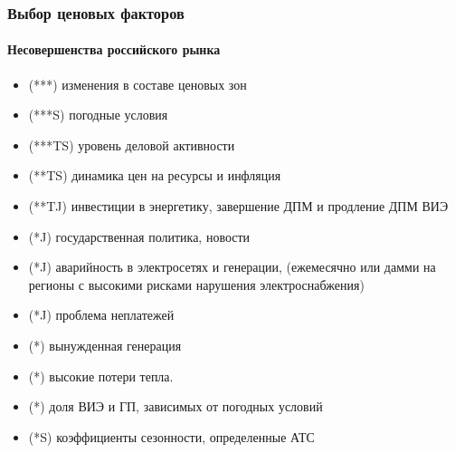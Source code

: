 \documentclass[c, dvipsnames]{beamer}  %
\begin{document}
\begin{frame}[shrink=5]
\frametitle{Выбор ценовых факторов } 
\framesubtitle{Несовершенства российского рынка} 

\begin{itemize}
	\item  (***)   изменения в составе ценовых зон
	\item  (***S)   погодные условия 
	\item  (***TS) уровень деловой активности  
	\item  (**TS) динамика цен на ресурсы и инфляция
	\item  (**TJ) инвестиции в энергетику, завершение ДПМ и продление ДПМ ВИЭ
	\item  (*J) государственная политика, новости
	\item  (*J) аварийность в электросетях и генерации, (ежемесячно или дамми на регионы с высокими рисками нарушения электроснабжения)
	\item  (*J) проблема неплатежей
	\item  (*) вынужденная генерация
	\item  (*) высокие потери тепла.
	\item  (*) доля ВИЭ и ГП, зависимых от погодных условий
	\item  (*S) коэффициенты сезонности, определенные АТС
\end{itemize}


\end{frame}
\end{document}
